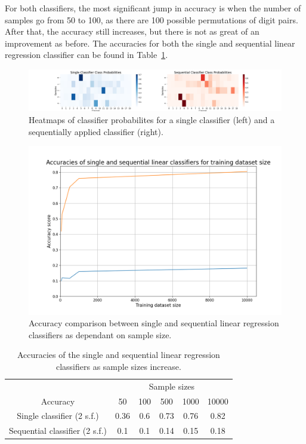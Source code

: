 \documentclass[11pt,a4paper]{article}
\begin{document}
For both classifiers, the most significant jump in accuracy is when the number of samples go from 50 to 100, as there are 100 possible permutations of digit pairs. After that, the accuracy still increases, but there is not as great of an improvement as before. The accuracies for both the single and sequential linear regression classifier can be found in Table~\ref{tab:lin_metric}.

\begin{figure}[htb]
    \centering
    \includegraphics[width=\columnwidth, keepaspectratio]{../classifier_heatmap.png}
    \caption{Heatmaps of classifier probabilites for a single classifier (left) and a sequentially applied classifier (right).}\label{fig:class_prob}
\end{figure}

\begin{figure}[htb]
    \centering
    \includegraphics[width=\columnwidth, keepaspectratio]{../classifier_compare.png}
    \caption{Accuracy comparison between single and sequential linear regression classifiers as dependant on sample size.}\label{fig:class_compare}
\end{figure}

\begin{table}[ht]
    \centering
    \begin{tabular}{c|c|c|c|c|c}
        & \multicolumn{5}{c}{Sample sizes} \\
        \cline{2-6}
        Accuracy& 50 & 100 & 500 & 1000 & 10000\\
        \hline
        Single classifier (2 s.f.)& 0.36 & 0.6 & 0.73 &0.76 &0.82\\
        Sequential classifier (2 s.f.)& 0.1 & 0.1 &0.14 &0.15& 0.18\\
    \end{tabular}
    \caption{Accuracies of the single and sequential linear regression classifiers as sample sizes increase.}\label{tab:lin_metric}
\end{table}
\clearpage
\end{document}
